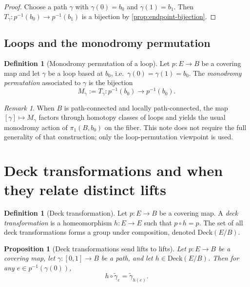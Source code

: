 \documentclass[11pt,a4paper]{article}
\newtheorem{proposition}[theorem]{Proposition}
\theoremstyle{definition}
\newtheorem{definition}[theorem]{Definition}
\theoremstyle{remark}
\newtheorem{remark}[theorem]{Remark}
\begin{document}
\begin{proof}
Choose a path \(\gamma\) with \(\gamma(0)=b_0\) and \(\gamma(1)=b_1\). Then \(T_\gamma:p^{-1}(b_0)\to p^{-1}(b_1)\) is a bijection by \cref{prop:endpoint-bijection}.
\end{proof}

\subsection{Loops and the monodromy permutation}
\label{sec:loop-monodromy}

\begin{definition}[Monodromy permutation of a loop]
\label{def:monodromy-perm}
Let \(p:E\to B\) be a covering map and let \(\gamma\) be a loop based at \(b_0\), i.e.\ \(\gamma(0)=\gamma(1)=b_0\). The \emph{monodromy permutation} associated to \(\gamma\) is the bijection
\[
M_\gamma := T_\gamma : p^{-1}(b_0)\to p^{-1}(b_0).
\]
\end{definition}

\begin{remark}
\label{rem:monodromy-group-action}
When \(B\) is path-connected and locally path-connected, the map \([\gamma]\mapsto M_\gamma\) factors through homotopy classes of loops and yields the usual monodromy action of \(\pi_1(B,b_0)\) on the fiber. This note does not require the full generality of that construction; only the loop-permutation viewpoint is used.
\end{remark}

\section{Deck transformations and when they relate distinct lifts}
\label{sec:deck}

\begin{definition}[Deck transformation]
\label{def:deck}
Let \(p:E\to B\) be a covering map. A \emph{deck transformation} is a homeomorphism \(h:E\to E\) such that \(p\circ h=p\). The set of all deck transformations forms a group under composition, denoted \(\mathrm{Deck}(E/B)\).
\end{definition}

\begin{proposition}[Deck transformations send lifts to lifts]
\label{prop:deck-sends-lifts}
Let \(p:E\to B\) be a covering map, let \(\gamma:[0,1]\to B\) be a path, and let \(h\in \mathrm{Deck}(E/B)\). Then for any \(e\in p^{-1}(\gamma(0))\),
\[
h\circ \tilde\gamma_e = \tilde\gamma_{h(e)}.
\]
\end{proposition}
\end{document}
